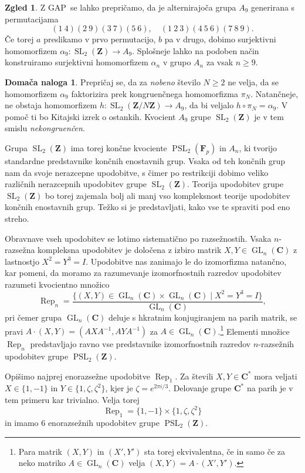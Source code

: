 \documentclass[11pt]{book}
\def\ZZ{\mathbf{Z}}
\def\CC{\mathbf{C}}
\def\FF{\mathbf{F}}
\DeclareMathOperator\Rep{Rep}
\DeclareMathOperator\GL{GL}
\DeclareMathOperator\SL{SL}
\DeclareMathOperator\PSL{PSL}
\theoremstyle{definition}
\theoremstyle{zgled}
\newtheorem{zgled}[theorem]{Zgled}
\theoremstyle{zgledbrezstevilke}
\theoremstyle{odprtproblem}
\theoremstyle{domacanaloga}
\newtheorem{domacanaloga}[theorem]{Domača naloga}
\theoremstyle{izrek}
\begin{document}
\begin{zgled}
Z GAP~se lahko prepričamo, da je alternirajoča grupa $A_9$ generirana s permutacijama
\[
    (1 \ 4)(2 \ 9)(3 \ 7)(5 \ 6), \quad
    (1 \ 2 \ 3)(4 \ 5 \ 6)(7 \ 8 \ 9).
\]
Če torej $a$ preslikamo v prvo permutacijo, $b$ pa v drugo, dobimo surjektivni homomorfizem $\alpha_9 \colon \SL_2(\ZZ) \to A_9$. Splošneje lahko na podoben način konstruiramo surjektivni homomorfizem $\alpha_n$ v grupo $A_n$ za vsak $n \geq 9$. 
\end{zgled}

\begin{domacanaloga}
Prepričaj se, da za \emph{nobeno} število $N \geq 2$ ne velja, da se homomorfizem $\alpha_9$ faktorizira prek kongruenčnega homomorfizma $\pi_N$. Natančneje, ne obstaja homomorfizem $h \colon \SL_2(\ZZ/N\ZZ) \to A_9$, da bi veljalo $h \circ \pi_N = \alpha_9$. V pomoč ti bo Kitajski izrek o ostankih. Kvocient $A_9$ grupe $\SL_2(\ZZ)$ je v tem smislu \emph{nekongruenčen}. 
\end{domacanaloga}

Grupa $\SL_2(\ZZ)$ ima torej končne kvociente $\PSL_2(\FF_p)$ in $A_n$, ki tvorijo standardne predstavnike končnih enostavnih grup. Vsaka od teh končnih grup nam da svoje nerazcepne upodobitve, s čimer po restrikciji dobimo veliko različnih nerazcepnih upodobitev grupe $\SL_2(\ZZ)$. Teorija upodobitev grupe $\SL_2(\ZZ)$ bo torej zajemala bolj ali manj vso kompleksnost teorije upodobitev končnih enostavnih grup. Težko si je predstavljati, kako vse te spraviti pod eno streho.

Obravnave vseh upodobitev se lotimo sistematično po razsežnostih. Vsaka $n$-razsežna kompleksna upodobitev je določena z izbiro matrik $X,Y \in \GL_n(\CC)$ z lastnostjo $X^2 = Y^3 = I$. Upodobitve nas zanimajo le do izomorfizma natančno, kar pomeni, da moramo za razumevanje izomorfnostnih razredov upodobitev razumeti kvocientno množico
\[
    {\textstyle \Rep_n} = \frac{\{ (X, Y) \in \GL_n(\CC) \times \GL_n(\CC) \mid X^2 = Y^3 = I \}}
    {\GL_n(\CC)},
\]
pri čemer grupa $\GL_n(\CC)$ deluje s hkratnim konjugiranjem na parih matrik, se pravi $A \cdot (X,Y) = (A X A^{-1}, A Y A^{-1})$ za $A \in \GL_n(\CC)$.\footnote{Para matrik $(X,Y)$ in $(X', Y')$ sta torej ekvivalentna, če in samo če za neko matriko $A \in \GL_n(\CC)$ velja $(X,Y) = A \cdot (X', Y')$.} Elementi množice $\Rep_n$ predstavljajo ravno vse predstavnike izomorfnostnih razredov $n$-razsežnih upodobitev grupe $\PSL_2(\ZZ)$.

Opišimo najprej enorazsežne upodobitve $\Rep_1$. Za števili $X,Y \in \CC^*$ mora veljati $X \in \{1, -1 \}$ in $Y \in \{ 1, \zeta, \zeta^2 \}$, kjer je $\zeta = e^{2 \pi i / 3}$. Delovanje grupe $\CC^*$ na parih je v tem primeru kar trivialno. Velja torej
\[
  \textstyle \Rep_1 = \{ 1, -1 \} \times \{ 1, \zeta, \zeta^2 \}
\]
in imamo $6$ enorazsežnih upodobitev grupe $\PSL_2(\ZZ)$.
\end{document}
